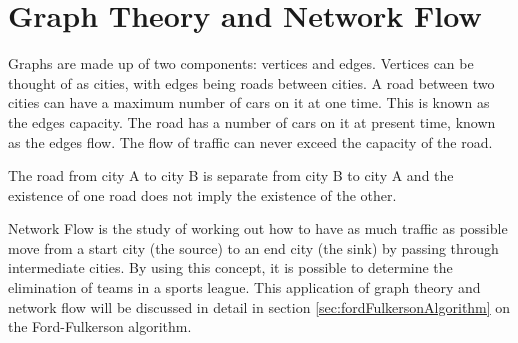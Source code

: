 \section{Graph Theory and Network Flow}
\label{sec:graphTheoryAndNetworkFlow}

Graphs are made up of two components: vertices and edges. Vertices can be
thought of as cities, with edges being roads between cities. A road between
two cities can have a maximum number of cars on it at one time. This is
known as the edges capacity. The road has a number of cars on it at present
time, known as the edges flow. The flow of traffic can never exceed the
capacity of the road.

The road from city A to city B is separate from city B to city A and the
existence of one road does not imply the existence of the other.

Network Flow is the study of working out how to have as much traffic as possible
move from a start city (the source) to an end city (the sink) by passing through 
intermediate cities. By using this concept, it is possible to determine
the elimination of teams in a sports league. This application of graph
theory and network flow will be discussed in detail in section
\ref{sec:fordFulkersonAlgorithm} on the Ford-Fulkerson algorithm.
